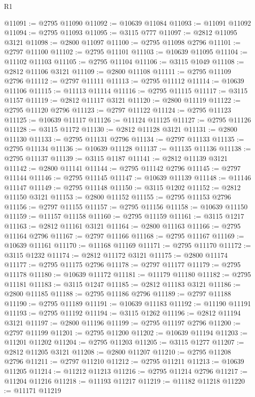 \begin{lexlean}{R1}
\begin{coremodule}
@11091 := @2795 @11090
@11092 := @10639 @11084
@11093 := @11091 @11092
@11094 := @2795 @11093
@11095 := @3115 @777
@11097 := @2812 @11095 @3121
@11098 := @2800 @11097
@11100 := @2795 @11098 @2796
@11101 := @2797 @11100
@11102 := @2795 @11101
@11103 := @10639 @11095
@11104 := @11102 @11103
@11105 := @2795 @11104
@11106 := @3115 @1049
@11108 := @2812 @11106 @3121
@11109 := @2800 @11108
@11111 := @2795 @11109 @2796
@11112 := @2797 @11111
@11113 := @2795 @11112
@11114 := @10639 @11106
@11115 := @11113 @11114
@11116 := @2795 @11115
@11117 := @3115 @1157
@11119 := @2812 @11117 @3121
@11120 := @2800 @11119
@11122 := @2795 @11120 @2796
@11123 := @2797 @11122
@11124 := @2795 @11123
@11125 := @10639 @11117
@11126 := @11124 @11125
@11127 := @2795 @11126
@11128 := @3115 @1172
@11130 := @2812 @11128 @3121
@11131 := @2800 @11130
@11133 := @2795 @11131 @2796
@11134 := @2797 @11133
@11135 := @2795 @11134
@11136 := @10639 @11128
@11137 := @11135 @11136
@11138 := @2795 @11137
@11139 := @3115 @1187
@11141 := @2812 @11139 @3121
@11142 := @2800 @11141
@11144 := @2795 @11142 @2796
@11145 := @2797 @11144
@11146 := @2795 @11145
@11147 := @10639 @11139
@11148 := @11146 @11147
@11149 := @2795 @11148
@11150 := @3115 @1202
@11152 := @2812 @11150 @3121
@11153 := @2800 @11152
@11155 := @2795 @11153 @2796
@11156 := @2797 @11155
@11157 := @2795 @11156
@11158 := @10639 @11150
@11159 := @11157 @11158
@11160 := @2795 @11159
@11161 := @3115 @1217
@11163 := @2812 @11161 @3121
@11164 := @2800 @11163
@11166 := @2795 @11164 @2796
@11167 := @2797 @11166
@11168 := @2795 @11167
@11169 := @10639 @11161
@11170 := @11168 @11169
@11171 := @2795 @11170
@11172 := @3115 @1232
@11174 := @2812 @11172 @3121
@11175 := @2800 @11174
@11177 := @2795 @11175 @2796
@11178 := @2797 @11177
@11179 := @2795 @11178
@11180 := @10639 @11172
@11181 := @11179 @11180
@11182 := @2795 @11181
@11183 := @3115 @1247
@11185 := @2812 @11183 @3121
@11186 := @2800 @11185
@11188 := @2795 @11186 @2796
@11189 := @2797 @11188
@11190 := @2795 @11189
@11191 := @10639 @11183
@11192 := @11190 @11191
@11193 := @2795 @11192
@11194 := @3115 @1262
@11196 := @2812 @11194 @3121
@11197 := @2800 @11196
@11199 := @2795 @11197 @2796
@11200 := @2797 @11199
@11201 := @2795 @11200
@11202 := @10639 @11194
@11203 := @11201 @11202
@11204 := @2795 @11203
@11205 := @3115 @1277
@11207 := @2812 @11205 @3121
@11208 := @2800 @11207
@11210 := @2795 @11208 @2796
@11211 := @2797 @11210
@11212 := @2795 @11211
@11213 := @10639 @11205
@11214 := @11212 @11213
@11216 := @2795 @11214 @2796
@11217 := @11204 @11216
@11218 := @11193 @11217
@11219 := @11182 @11218
@11220 := @11171 @11219

\end{coremodule}
\end{lexlean}

